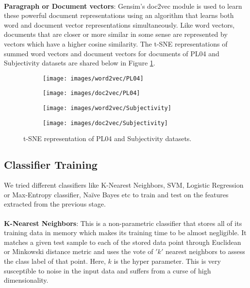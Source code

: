 \documentclass[a4paper,26pt]{article}
\begin{document}
\paragraph{}
\textbf{Paragraph or Document vectors}: Gensim's doc2vec module is used to learn these powerful document representations using an algorithm that learns both word and document vector representations simultaneously. Like word vectors, documents that are closer or more similar in some sense are represented by vectors which have a higher cosine similarity. The t-SNE representations of summed word vectors and document vectors for documents of PL04 and Subjectivity datasets are shared below in Figure \ref{fig:tsne}.

\begin{figure}[H]
    \centering
    \begin{subfigure}[b]{0.4\textwidth}
        \centering
        \texttt{[image: images/word2vec/PL04]}
        \caption{}
    \end{subfigure}
    \begin{subfigure}[b]{0.4\textwidth}
        \centering
        \texttt{[image: images/doc2vec/PL04]}
        \caption{}
    \end{subfigure}
    \hfill
    \begin{subfigure}[b]{0.4\textwidth}
        \centering
        \texttt{[image: images/word2vec/Subjectivity]}
        \caption{}
    \end{subfigure}
    \begin{subfigure}[b]{0.4\textwidth}
        \centering
        \texttt{[image: images/doc2vec/Subjectivity]}
        \caption{}
    \end{subfigure}
    \caption{t-SNE representation of PL04 and Subjectivity datasets.}
    \label{fig:tsne}
\end{figure}

\subsection{Classifier Training}

We tried different classifiers like K-Nearest Neighbors, SVM, Logistic Regression or Max-Entropy classifier, Na\"{i}ve Bayes etc to train and test on the features extracted from the previous stage.

\paragraph{}
\textbf{K-Nearest Neighbors}: This is a non-parametric classifier that stores all of its training data in memory which makes its training time to be almost negligible. It matches a given test sample to each of the stored data point through Euclidean or Minkowski distance metric and uses the vote of $'k'$ nearest neighbors to assess the class label of that point. Here, $k$ is the hyper parameter. This is very susceptible to noise in the input data and suffers from a curse of high dimensionality.
\end{document}
